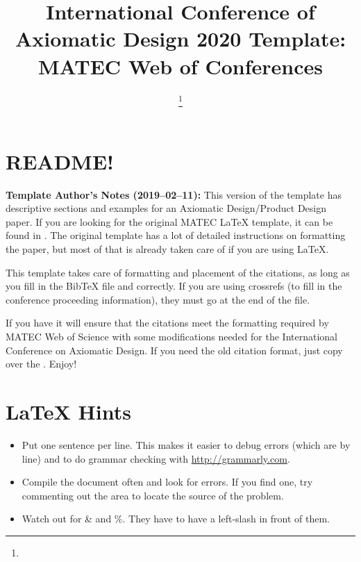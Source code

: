 \documentclass[twocolumn]{webofc}
\begin{document}
        \title{International Conference of Axiomatic Design 2020 Template: MATEC Web of Conferences}

        \author{ \fnsep\thanks{} 
        \and
   
}


%
\maketitle
%
\section*{README!}\label{sec:readme}
\textbf{Template Author's Notes (2019--02--11):}
  This version of the template has descriptive sections and examples for an Axiomatic Design/Product Design paper.
  If you are looking for the original MATEC LaTeX template, it can be found in .
  The original template has a lot of detailed instructions on formatting the paper, but most of that is already taken care of if you are using LaTeX.

  This template takes care of formatting and placement of the citations, as long as you fill in the BibTeX file  and  correctly.
  If you are using crossrefs (to fill in the conference proceeding information), they must go at the end of the  file.

        If you have  it will ensure that the citations meet the formatting required by MATEC Web of Science with some modifications needed for the International Conference on Axiomatic Design.
        If you need the old citation format, just copy  over the .
        Enjoy!


\listoffixmes{}

\section*{\LaTeX{} Hints}
\begin{itemize}
\item Put one sentence per line.
  This makes it easier to debug errors (which are by line) and to do grammar checking with \url{http://grammarly.com}.
\item Compile the document often and look for errors.
  If you find one, try commenting out the area to locate the source of the problem.
\item Watch out for \& and \%.  They have to have a left-slash in front of them.
\end{itemize}
\end{document}
